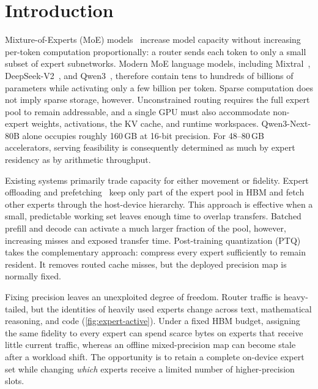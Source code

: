\section{Introduction}
\label{sec:introduction}

Mixture-of-Experts (MoE) models~\cite{shazeer2017outrageously} increase model capacity without increasing per-token computation proportionally: a router sends each token to only a small subset of expert subnetworks. Modern MoE language models, including Mixtral~\cite{jiang2024mixtral}, DeepSeek-V2~\cite{deepseekv2}, and Qwen3~\cite{qwen3technicalreport}, therefore contain tens to hundreds of billions of parameters while activating only a few billion per token. Sparse computation does not imply sparse storage, however. Unconstrained routing requires the full expert pool to remain addressable, and a single GPU must also accommodate non-expert weights, activations, the KV cache, and runtime workspaces. Qwen3-Next-80B alone occupies roughly 160\,GB at 16-bit precision. For 48--80\,GB accelerators, serving feasibility is consequently determined as much by expert residency as by arithmetic throughput.

Existing systems primarily trade capacity for either movement or fidelity. Expert offloading and prefetching~\cite{li2023adaptive,yi2023edgemoe,xue2024moe,eliseev2023fast,hwang2024pre,zhong2024adapmoe,tang2024hobbit,song2024promoe,shen2025expertflow} keep only part of the expert pool in HBM and fetch other experts through the host-device hierarchy. This approach is effective when a small, predictable working set leaves enough time to overlap transfers. Batched prefill and decode can activate a much larger fraction of the pool, however, increasing misses and exposed transfer time. Post-training quantization (PTQ)~\cite{lin2024awq,frantar2022gptq,kim2023mixturequantizedexpertsmoqe,duanmu2025mxmoe} takes the complementary approach: compress every expert sufficiently to remain resident. It removes routed cache misses, but the deployed precision map is normally fixed.

Fixing precision leaves an unexploited degree of freedom. Router traffic is heavy-tailed, but the identities of heavily used experts change across text, mathematical reasoning, and code (\autoref{fig:expert-active}). Under a fixed HBM budget, assigning the same fidelity to every expert can spend scarce bytes on experts that receive little current traffic, whereas an offline mixed-precision map can become stale after a workload shift. The opportunity is to retain a complete on-device expert set while changing \emph{which} experts receive a limited number of higher-precision slots.

